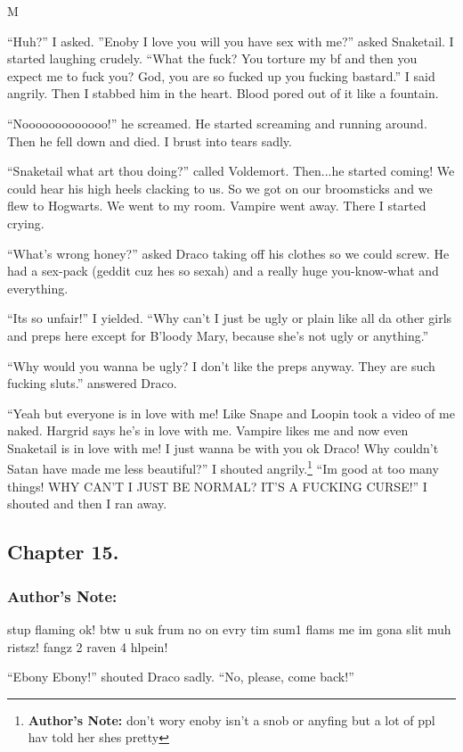 M\documentclass{article}
\begin{document}
“Huh?” I asked.
”Enoby I love you will you have sex with me?” asked Snaketail. I started laughing crudely. “What the fuck? You torture my bf and then you expect me to fuck you? God, you are so fucked up you fucking bastard.” I said angrily. Then I stabbed him in the heart. Blood pored out of it like a fountain.

“Nooooooooooooo!” he screamed. He started screaming and running around. Then he fell down and died. I brust into tears sadly.

“Snaketail what art thou doing?” called Voldemort. Then...he started coming! We could hear his high heels clacking to us. So we got on our broomsticks and we flew to Hogwarts. We went to my room. Vampire went away. There I started crying.

“What’s wrong honey?” asked Draco taking off his clothes so we could screw. He had a sex-pack (geddit cuz hes so sexah) and a really huge you-know-what and everything.

“Its so unfair!” I yielded. “Why can’t I just be ugly or plain like all da other girls and preps here except for B’loody Mary, because she’s not ugly or anything.”

“Why would you wanna be ugly? I don’t like the preps anyway. They are such fucking sluts.” answered Draco.

“Yeah but everyone is in love with me! Like Snape and Loopin took a video of me naked. Hargrid says he’s in love with me. Vampire likes me and now even Snaketail is in love with me! I just wanna be with you ok Draco! Why couldn’t Satan have made me less beautiful?” I shouted angrily.\footnote{\textbf{Author's Note: }don’t wory enoby isn’t a snob or anyfing but a lot of ppl hav told her shes pretty} “Im good at too many things! WHY CAN’T I JUST BE NORMAL? IT’S A FUCKING CURSE!” I shouted and then I ran away.

\clearpage\nolinenumbers
\subsection*{Chapter 15.}

\subsubsection*{Author's Note: }stup flaming ok! btw u suk frum no on evry tim sum1 flams me im gona slit muh ristsz! fangz 2 raven 4 hlpein!

\textbreak
\linenumbers\resetlinenumber

“Ebony Ebony!” shouted Draco sadly. “No, please, come back!”
\end{document}
